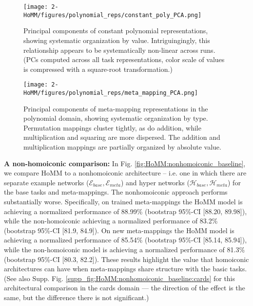 \begin{figure}[ptbh]
\centering
\texttt{[image: 2-HoMM/figures/polynomial\_reps/constant\_poly\_PCA.png]}
\caption[Principal components of constant polynomial representations, showing systematic organization by value.]{Principal components of constant polynomial representations, showing systematic organization by value. Intriguingingly, this relationship appears to be systematically non-linear across runs. (PCs computed across all task representations, color scale of values is compressed with a square-root transformation.)} \label{fig:HoMM_polynomials:reps_const_poly_PCA}
\end{figure}

\begin{figure}[ptbh]
\centering
\texttt{[image: 2-HoMM/figures/polynomial\_reps/meta\_mapping\_PCA.png]}
\caption[Principal components of meta-mapping representations in the polynomial domain, showing systematic organization by type.]{Principal components of meta-mapping representations in the polynomial domain, showing systematic organization by type. Permutation mappings cluster tightly, as do addition, while multiplication and squaring are more dispersed. The addition and multiplication mappings are partially organized by absolute value.} \label{fig:HoMM_polynomials:reps_meta_mapping_PCA}
\end{figure}

\textbf{A non-homoiconic comparison:} In Fig. \ref{fig:HoMM:nonhomoiconic_baseline}, we compare HoMM to a nonhomoiconic architecture -- i.e. one in which there are separate example networks (\(\mathcal{E}_{base},\mathcal{E}_{meta}\)) and hyper networks (\(\mathcal{H}_{base},\mathcal{H}_{meta}\)) for the base tasks and meta-mappings. The nonhomoiconic approach performs substantially worse. Specifically, on trained meta-mappings the HoMM model is achieving a normalized performance of 88.99\% (bootstrap 95\%-CI [88.20, 89.98]), while the non-homoiconic achieving a normalized performance of 83.2\% (bootstrap 95\%-CI [81.9, 84.9]). On new meta-mappings the HoMM model is achieving a normalized performance of 85.54\% (bootstrap 95\%-CI [85.14, 85.94]), while the non-homoiconic model is achieving a normalized performance of 81.3\% (bootstrap 95\%-CI [80.3, 82.2]). These results highlight the value that homoiconic architectures can have when meta-mappings share structure with the basic tasks. (See also Supp. Fig. \ref{supp_fig:HoMM:nonhomoiconic_baseline:cards} for this architectural comparison in the cards domain --- the direction of the effect is the same, but the difference there is not significant.) 

